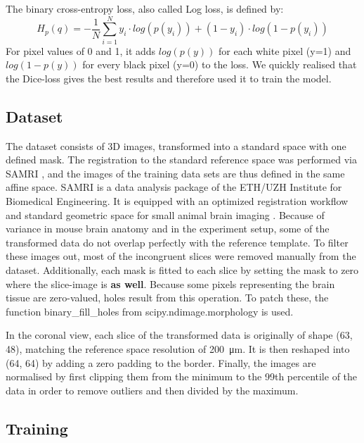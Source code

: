 \documentclass{article}
\begin{document}
The binary cross-entropy loss, also called Log loss, is defined by:
$$H_p (q) = -\frac{1}{N} \sum ^N _{i=1} y_i \cdot log(p(y_i))+(1-y_i) \cdot log(1-p(y_i))$$
For pixel values of 0 and 1, it adds $log(p(y))$ for each white pixel (y=1) and $log(1-p(y))$ for every black pixel (y=0) to the loss.
We quickly realised that the Dice-loss gives the best results and therefore used it to train the model. 




\subsection{Dataset}
The dataset consists of 3D images, transformed into a standard space with one defined mask.
The registration to the standard reference space was performed via SAMRI \cite{noauthor_ibt-fmi/samri_2019}, and the images of the training data sets are thus defined in the same affine space.
SAMRI is a data analysis package of the ETH/UZH Institute for Biomedical Engineering.
It is equipped with an optimized registration workflow and standard geometric space for small animal brain imaging \cite{ioanas_optimized_2019}.
Because of variance in mouse brain anatomy and in the experiment setup, some of the transformed data do not overlap perfectly with the reference template.
To filter these images out, most of the incongruent slices were removed manually from the dataset.
Additionally, each mask is fitted to each slice by setting the mask to zero where the slice-image is \textbf{as well}.
Because some pixels representing the brain tissue are zero-valued, holes result from this operation.
To patch these, the function binary\_fill\_holes from scipy.ndimage.morphology \cite{noauthor_multi-dimensional_nodate} is used.

In the coronal view, each slice of the transformed data is originally of shape (63, 48), matching the reference space resolution of \SI{200}{\micro\metre}.
It is then reshaped into (64, 64) by adding a zero padding to the border.
Finally, the images are normalised by first clipping them from the minimum to the 99th percentile of the data in order to remove outliers and then divided by the maximum.

\subsection{Training}
\end{document}
